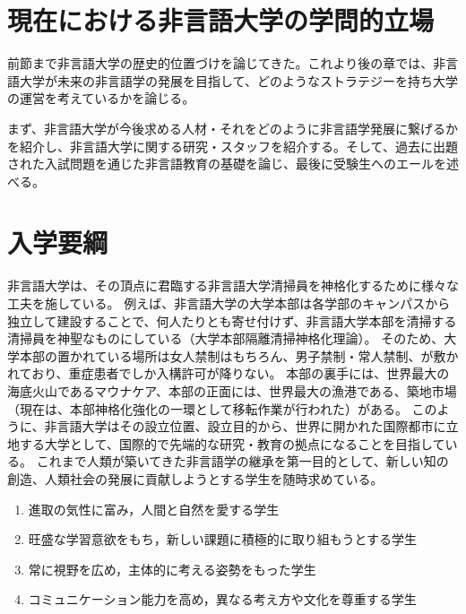 \section{現在における非言語大学の学問的立場}
前節まで非言語大学の歴史的位置づけを論じてきた。これより後の章では、非言語大学が未来の非言語学の発展を目指して、どのようなストラテジーを持ち大学の運営を考えているかを論じる。\par
まず、非言語大学が今後求める人材・それをどのように非言語学発展に繋げるかを紹介し、非言語大学に関する研究・スタッフを紹介する。そして、過去に出題された入試問題を通じた非言語教育の基礎を論じ、最後に受験生へのエールを述べる。
\section{入学要綱}
非言語大学は、その頂点に君臨する非言語大学清掃員を神格化するために様々な工夫を施している。
例えば、非言語大学の大学本部は各学部のキャンパスから独立して建設することで、何人たりとも寄せ付けず、非言語大学本部を清掃する清掃員を神聖なものにしている（大学本部隔離清掃神格化理論）。
そのため、大学本部の置かれている場所は女人禁制はもちろん、男子禁制・常人禁制、が敷かれており、重症患者でしか入構許可が降りない。
本部の裏手には、世界最大の海底火山であるマウナケア、本部の正面には、世界最大の漁港である、築地市場（現在は、本部神格化強化の一環として移転作業が行われた）がある。
このように、非言語大学はその設立位置、設立目的から、世界に開かれた国際都市に立地する大学として、国際的で先端的な研究・教育の拠点になることを目指している。
これまで人類が築いてきた非言語学の継承を第一目的として、新しい知の創造、人類社会の発展に貢献しようとする学生を随時求めている。

\begin{enumerate}
\item 進取の気性に富み，人間と自然を愛する学生
\item 旺盛な学習意欲をもち，新しい課題に積極的に取り組もうとする学生
\item 常に視野を広め，主体的に考える姿勢をもった学生
\item コミュニケーション能力を高め，異なる考え方や文化を尊重する学生 
\end{enumerate}

